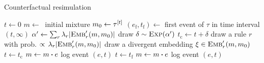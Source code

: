 \newcommand{\EVF}[0]{e_{\text{f}}}
\newcommand{\EVCF}[0]{e_{\text{c}}}

\begin{algorithm}
\caption{Counterfactual resimulation}\label{alg:cosimulation}
\begin{spacing}{1.3}
\begin{algorithmic}[1]
\vspace{0.2cm}
\STATE $t \gets 0$
\STATE $m \gets\ $ initial mixture
  \STATE $m_0 \gets \tau^{[t]}$
  \STATE $(\EVF{}, t_{\text{f}}) \gets $ first event of $\tau$ in time interval $(t, \infty)$
  \vspace{0.1cm}
  \STATE $\alpha' \gets \sum_r {\lambda_r |{\textsc{Emb}}'_{r}(m, m_0)|}$
  \vspace{0.1cm}
  \STATE draw $\delta \sim \textsc{Exp}(\alpha') $
  \STATE $t_{\text{c}} \gets t + \delta$
      \STATE draw a rule $r$ with prob.
      $\propto \, \lambda_r |{\textsc{Emb}}'_{r}(m, m_0)|$
      \STATE  draw a divergent embedding $\xi \in {\textsc{Emb}}'_{r}(m, m_0)$
          \STATE $t \gets t_{\text{c}}$
          \STATE $m \gets \UPDATE{m}{e}$
          \STATE log event $(e, t)$
      \ENDIF
  \ELSE
      \STATE {$e \gets \EVF{}$}
      \STATE $t \gets t_{\text{f}}$
          \STATE $m \gets \UPDATE{m}{e}$
          \STATE log event $(e, t)$
      
      \ENDIF 
  \ENDIF
\ENDWHILE
\vspace{0.1cm}
\end{algorithmic}
\end{spacing}
\end{algorithm}